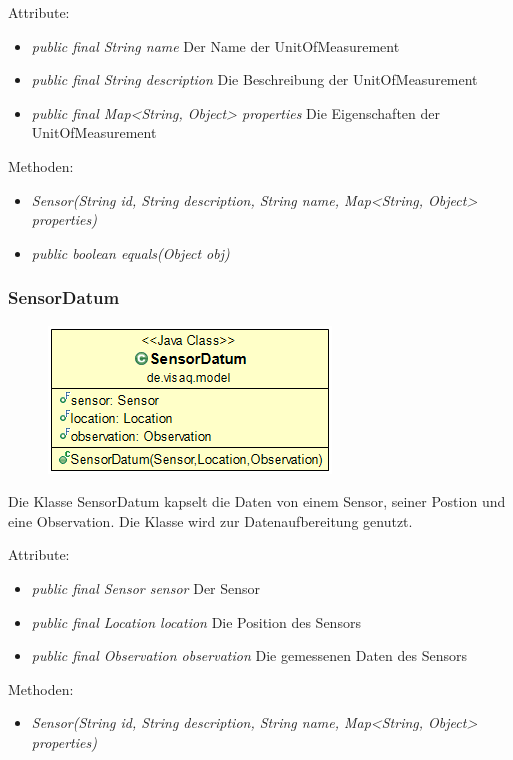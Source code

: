 Attribute:
\begin{itemize} 
	\item \emph{public final String name} Der Name der UnitOfMeasurement
	\item \emph{public final String description} Die Beschreibung der UnitOfMeasurement
	\item \emph{public final Map<String, Object> properties} Die Eigenschaften der UnitOfMeasurement
\end{itemize}
Methoden:
\begin{itemize} 
	\item \emph{Sensor(String id, String description, String name, Map<String, Object> properties)} 
	\item \emph{public boolean equals(Object obj)} 
\end{itemize}


\subsubsection {SensorDatum}
\begin{minipage}{0.3\textwidth}
	\begin{figure}[H]
		\includegraphics[scale = 0.5
		]{media/frontend/model/SensorDatum_Class.png}
	\end{figure}
\end{minipage} \hfill
\begin{minipage}{0.6\textwidth}
	Die Klasse SensorDatum kapselt die Daten von einem Sensor, seiner Postion und eine Observation. Die Klasse wird zur Datenaufbereitung genutzt.
\end{minipage}

Attribute:
\begin{itemize} 
	\item \emph{public final Sensor sensor} Der Sensor
	\item \emph{public final Location location} Die Position des Sensors
	\item \emph{public final Observation observation} Die gemessenen Daten des Sensors
\end{itemize}
Methoden:
\begin{itemize} 
	\item \emph{Sensor(String id, String description, String name, Map<String, Object> properties)} 
\end{itemize}
